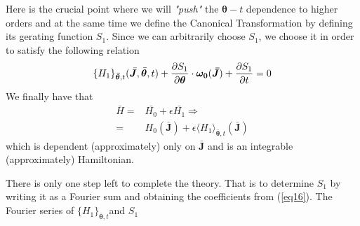 	Here is the crucial point where we will \textit{"push"} the $\bm{\theta}-t$ dependence to higher orders and at the same time we define the Canonical Transformation by defining its gerating function $S_1$. Since we can arbitrarily choose $S_1$, we choose it in order to satisfy the following relation
	\begin{equation}\label{eq16}
		\{H_1\}_{\bm{\bar{\theta}}, t}(\bar{\bm{J}}, \bar{\bm{\theta}}, t) + \pdv{S_1}{\bm{\theta}}\cdot \bm{\omega_0}(\bm{\bar{J}})+ \pdv{S_1}{t} = 0
	\end{equation}	
We finally have that 
	\begin{align}\label{eq17}
		\bar{H} =&  \bar{H_0} + \epsilon\bar{H_1}  \Rightarrow\nonumber\\
				=& H_0(\bar{\bm{J}}) + \epsilon\langle H_1 \rangle_{\bm{\bar{\theta}}, t}(\bar{\bm{J}}) 
	\end{align}
which is dependent (approximately) only on $\bar{\bm{J}}$ and is an integrable (approximately) Hamiltonian.

There is only one step left to complete the theory. That is to determine $S_1$ by writing it as a Fourier sum and obtaining the coefficients from (\ref{eq16}). The Fourier series of $\{H_1\}_{\bm{\bar{\theta}},t}$\footnotemark and $S_1$
	
